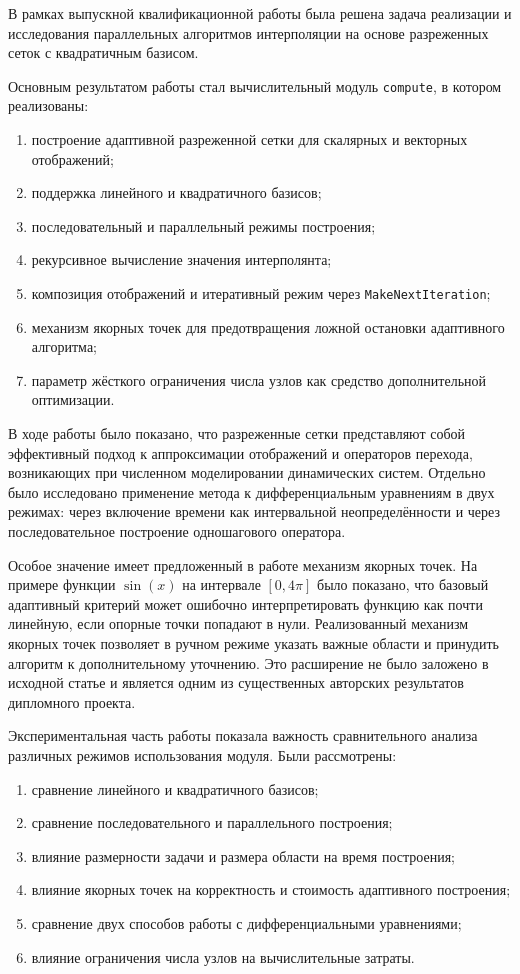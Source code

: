В рамках выпускной квалификационной работы была решена задача реализации и исследования параллельных алгоритмов интерполяции на основе разреженных сеток с квадратичным базисом.

Основным результатом работы стал вычислительный модуль \texttt{compute}, в котором реализованы:
\begin{enumerate}
    \item построение адаптивной разреженной сетки для скалярных и векторных отображений;
    \item поддержка линейного и квадратичного базисов;
    \item последовательный и параллельный режимы построения;
    \item рекурсивное вычисление значения интерполянта;
    \item композиция отображений и итеративный режим через \texttt{MakeNextIteration};
    \item механизм якорных точек для предотвращения ложной остановки адаптивного алгоритма;
    \item параметр жёсткого ограничения числа узлов как средство дополнительной оптимизации.
\end{enumerate}

В ходе работы было показано, что разреженные сетки представляют собой эффективный подход к аппроксимации отображений и операторов перехода, возникающих при численном моделировании динамических систем. Отдельно было исследовано применение метода к дифференциальным уравнениям в двух режимах: через включение времени как интервальной неопределённости и через последовательное построение одношагового оператора.

Особое значение имеет предложенный в работе механизм якорных точек. На примере функции $\sin(x)$ на интервале $[0,4\pi]$ было показано, что базовый адаптивный критерий может ошибочно интерпретировать функцию как почти линейную, если опорные точки попадают в нули. Реализованный механизм якорных точек позволяет в ручном режиме указать важные области и принудить алгоритм к дополнительному уточнению. Это расширение не было заложено в исходной статье \cite{Morozov2024} и является одним из существенных авторских результатов дипломного проекта.

Экспериментальная часть работы показала важность сравнительного анализа различных режимов использования модуля. Были рассмотрены:
\begin{enumerate}
    \item сравнение линейного и квадратичного базисов;
    \item сравнение последовательного и параллельного построения;
    \item влияние размерности задачи и размера области на время построения;
    \item влияние якорных точек на корректность и стоимость адаптивного построения;
    \item сравнение двух способов работы с дифференциальными уравнениями;
    \item влияние ограничения числа узлов на вычислительные затраты.
\end{enumerate}

